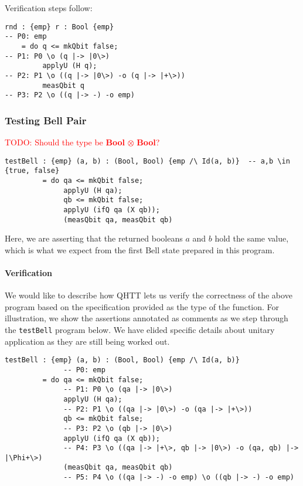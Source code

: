 \documentclass[acmsmall,nonacm,timestamp,review=false,anonymous=false]{acmart}
\newcommand{\type}[1]{\textrm{\textbf{#1}}}
\newcommand{\todo}[1]{\textcolor{red}{#1}}
\begin{document}
Verification steps follow:

\begin{minipage}{0.95\linewidth}
\begin{lstlisting}[language=QHaskell]
rnd : {emp} r : Bool {emp}
-- P0: emp
    = do q <= mkQbit false;
-- P1: P0 \o (q |-> |0\>)
         applyU (H q);
-- P2: P1 \o ((q |-> |0\>) -o (q |-> |+\>))
         measQbit q
-- P3: P2 \o ((q |-> -) -o emp)
\end{lstlisting}
\end{minipage}

\subsubsection{Testing Bell Pair}
\leavevmode
\todo{TODO: Should the type be \type{Bool} $\otimes$ \type{Bool}?}

\begin{minipage}{0.95\linewidth}
\begin{lstlisting}[language=QHaskell]
testBell : {emp} (a, b) : (Bool, Bool) {emp /\ Id(a, b)}  -- a,b \in {true, false}
         = do qa <= mkQbit false;
              applyU (H qa);
              qb <= mkQbit false;
              applyU (ifQ qa (X qb));
              (measQbit qa, measQbit qb)
\end{lstlisting}
\end{minipage}

Here, we are asserting that the returned booleans $a$ and $b$ hold the same value, which is what we expect from the first Bell state prepared in this program.

\paragraph{Verification}
We would like to describe how QHTT lets us verify the correctness of the above program based on the specification provided as the type of the function. For illustration, we show the assertions annotated as comments as we step through the \texttt{testBell} program below. We have elided specific details about unitary application as they are still being worked out.

\begin{lstlisting}[language=QHaskell]
testBell : {emp} (a, b) : (Bool, Bool) {emp /\ Id(a, b)}
              -- P0: emp
         = do qa <= mkQbit false;
              -- P1: P0 \o (qa |-> |0\>)
              applyU (H qa);
              -- P2: P1 \o ((qa |-> |0\>) -o (qa |-> |+\>))
              qb <= mkQbit false;
              -- P3: P2 \o (qb |-> |0\>)
              applyU (ifQ qa (X qb));
              -- P4: P3 \o ((qa |-> |+\>, qb |-> |0\>) -o (qa, qb) |-> |\Phi+\>)
              (measQbit qa, measQbit qb)
              -- P5: P4 \o ((qa |-> -) -o emp) \o ((qb |-> -) -o emp)
\end{lstlisting}
\end{document}
